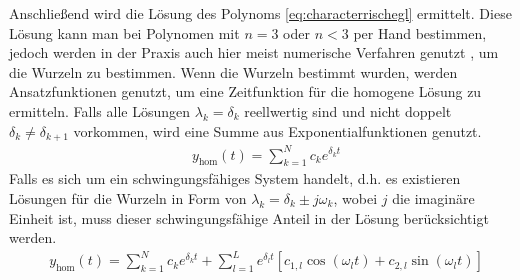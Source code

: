 %
Anschließend wird die Lösung des Polynoms \eqref{eq:characterrischegl} ermittelt. Diese Lösung kann man bei Polynomen mit $n=3$ oder $n<3$ per Hand bestimmen, jedoch werden in der Praxis auch hier meist numerische Verfahren genutzt \cite{Lunze10} \cite{Bruen21}, um die Wurzeln zu bestimmen. Wenn die Wurzeln bestimmt wurden, werden Ansatzfunktionen genutzt, um eine Zeitfunktion für die homogene Lösung zu ermitteln. Falls alle Lösungen $\lambda_{k}=\delta_{k}$ reellwertig sind und nicht doppelt $\delta_{k}\neq\delta_{k+1}$ vorkommen, wird eine Summe aus Exponentialfunktionen genutzt.
%
\begin{equation}
\begin{aligned}
&y_{\text{hom}}(t)=\sum_{k=1}^{N}c_{k}e^{\delta_{k}t}\label{eq:dglloesungreel}
\end{aligned}
\end{equation}
%
Falls es sich um ein schwingungsfähiges System handelt, d.h. es existieren Lösungen für die Wurzeln in Form von $\lambda_{k}=\delta_{k}\pm j\omega_{k}$, wobei $j$ die imaginäre Einheit ist, muss dieser schwingungsfähige Anteil in der Lösung berücksichtigt werden.
%
\begin{equation}
\begin{aligned}
&y_{\text{hom}}(t)=\sum_{k=1}^{N}c_{k}e^{\delta_{k}t}+\sum_{l=1}^{L}e^{\delta_{l}t}\left[c_{1,l}\cos(\omega_{l}t)+c_{2,l}\sin(\omega_{l}t)\right]\label{eq:dglloesungkomplex}
\end{aligned}
\end{equation}
%

